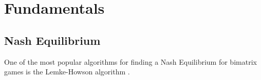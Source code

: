 \chapter{Fundamentals}
\label{chp:basics}

\section{Nash Equilibrium}
One of the most popular algorithms for finding a Nash Equilibrium for bimatrix games is the Lemke-Howson algorithm \citep{LemkeHowsonMatlab}.
